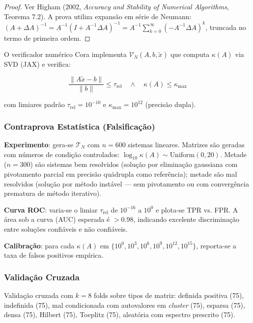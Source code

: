 \documentclass[5p]{elsarticle}
\theoremstyle{remark}
\begin{document}
\begin{proof}
Ver Higham (2002, \textit{Accuracy and Stability of Numerical Algorithms}, Teorema 7.2). A prova utiliza expansão em série de Neumann: $(A + \Delta A)^{-1} = A^{-1}(I + A^{-1}\Delta A)^{-1} = A^{-1}\sum_{k=0}^{\infty}(-A^{-1}\Delta A)^k$, truncada no termo de primeira ordem.
\end{proof}

O verificador numérico Cora implementa $\mathcal{V}_N(A, b, \tilde{x})$ que computa $\kappa(A)$ via SVD (JAX) e verifica:

\begin{equation}
\frac{\|A\tilde{x} - b\|}{\|b\|} \leq \tau_{\text{rel}} \quad \wedge \quad \kappa(A) \leq \kappa_{\text{max}}
\label{eq:c5_verify}
\end{equation}

com limiares padrão $\tau_{\text{rel}} = 10^{-10}$ e $\kappa_{\text{max}} = 10^{12}$ (precisão dupla).

\subsubsection{Contraprova Estatística (Falsificação)}

\textbf{Experimento}: gera-se $\mathcal{T}_N$ com $n = 600$ sistemas lineares. Matrizes são geradas com números de condição controlados: $\log_{10} \kappa(A) \sim \text{Uniform}(0, 20)$. Metade ($n = 300$) são sistemas bem resolvidos (solução por eliminação gaussiana com pivotamento parcial em precisão quádrupla como referência); metade são mal resolvidos (solução por método instável --- sem pivotamento ou com convergência prematura de método iterativo).

\textbf{Curva ROC}: varia-se o limiar $\tau_{\text{rel}}$ de $10^{-16}$ a $10^{0}$ e plota-se TPR vs. FPR. A área sob a curva (AUC) esperada é $> 0.98$, indicando excelente discriminação entre soluções confiáveis e não confiáveis.

\textbf{Calibração}: para cada $\kappa(A)$ em $\{10^0, 10^3, 10^6, 10^9, 10^{12}, 10^{15}\}$, reporta-se a taxa de falsos positivos empírica.

\subsubsection{Validação Cruzada}

Validação cruzada com $k = 8$ folds sobre tipos de matriz: definida positiva (75), indefinida (75), mal condicionada com autovalores em \textit{cluster} (75), esparsa (75), densa (75), Hilbert (75), Toeplitz (75), aleatória com espectro prescrito (75).
\end{document}
